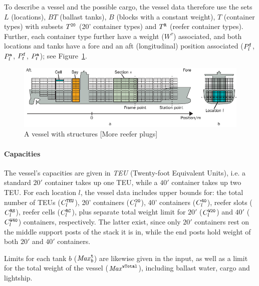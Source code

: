 To describe a vessel and the possible cargo, the vessel data therefore use the sets $L$ (locations), $BT$ (ballast tanks), $B$ (blocks with a constant weight), $T$ (container types) with subsets $T^{\texttt{20}}$ (20' container types) and $T^{\texttt{R}}$ (reefer container types). Further, each container type further have a weight ($W^\tau$) associated, and both locations and tanks have a fore and an aft (longitudinal) position associated ($P^{\texttt{f}}_l$, $P^{\texttt{a}}_l$, $P^{\texttt{f}}_t$, $P^{\texttt{a}}_t$); see Figure~\ref{fig:vessel}.    

\begin{figure}
	\centering
		\includegraphics{figures/vessel.pdf}
	\caption{A vessel with structures [More reefer plugs]}
	\label{fig:vessel}
\end{figure}

\paragraph{Capacities}
The vessel's capacities are given in \emph{TEU} (Twenty-foot Equivalent Units), i.e. a standard $20'$ container takes up one TEU, while a $40'$ container takes up two TEU. For each location $l$, the vessel data includes upper bounds for: the total number of TEUs ($C^{\texttt{TEU}}_l$), 20' containers ($C^{\texttt{20}}_l$), 40' containers ($C^{\texttt{40}}_l$), reefer slots ($C^{\texttt{RS}}_l$), reefer cells ($C^{\texttt{RC}}_l$), plus separate total weight limit for $20'$ ($C^{\texttt{W20}}_l$) and $40'$ ($C^{\texttt{W40}}_l$) containers, respectively. The latter exist, since only $20'$ containers rest on the middle support posts of the stack it is in, while the end posts hold weight of both $20'$ and $40'$ containers. 

Limits for each tank $b$ ($\mathit{Max}^{\texttt{t}}_b$) are likewise given in the input, as well as a limit for the total weight of the vessel ($\mathit{Max}^{\texttt{wTotal}}$), including ballast water, cargo and lightship. 

